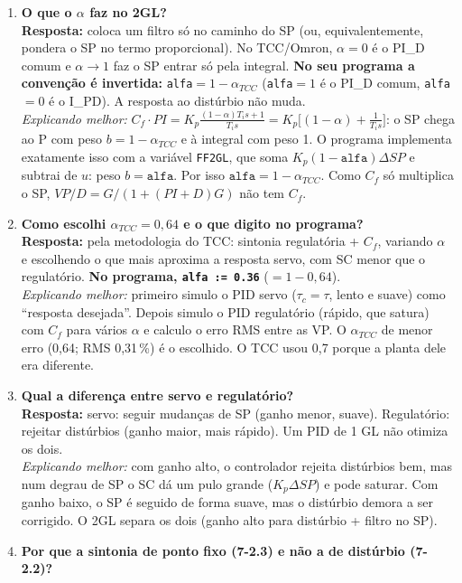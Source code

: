 \documentclass[11pt,a4paper]{article}
\begin{document}
\begin{enumerate}[leftmargin=*]
\item \textbf{O que o $\alpha$ faz no 2GL?}\\
\textbf{Resposta:} coloca um filtro só no caminho do SP (ou, equivalentemente, pondera o SP no termo proporcional). No TCC/Omron, $\alpha=0$ é o PI\_D comum e $\alpha\to1$ faz o SP entrar só pela integral. \textbf{No seu programa a convenção é invertida:} \texttt{alfa}$=1-\alpha_{TCC}$ (\texttt{alfa}$=1$ é o PI\_D comum, \texttt{alfa}$=0$ é o I\_PD). A resposta ao distúrbio não muda.\\
\emph{Explicando melhor:} $C_f\cdot PI=K_p\frac{(1-\alpha)T_is+1}{T_is}=K_p\big[(1-\alpha)+\frac1{T_is}\big]$: o SP chega ao P com peso $b=1-\alpha_{TCC}$ e à integral com peso 1. O programa implementa exatamente isso com a variável \texttt{FF2GL}, que soma $K_p(1-\mathtt{alfa})\Delta SP$ e subtrai de $u$: peso $b=\mathtt{alfa}$. Por isso $\mathtt{alfa}=1-\alpha_{TCC}$. Como $C_f$ só multiplica o SP, $VP/D=G/(1+(PI+D)G)$ não tem $C_f$.
\item \textbf{Como escolhi $\alpha_{TCC}=0{,}64$ e o que digito no programa?}\\
\textbf{Resposta:} pela metodologia do TCC: sintonia regulatória + $C_f$, variando $\alpha$ e escolhendo o que mais aproxima a resposta servo, com SC menor que o regulatório. \textbf{No programa, \texttt{alfa := 0.36}} ($=1-0{,}64$).\\
\emph{Explicando melhor:} primeiro simulo o PID servo ($\tau_c=\tau$, lento e suave) como ``resposta desejada''. Depois simulo o PID regulatório (rápido, que satura) com $C_f$ para vários $\alpha$ e calculo o erro RMS entre as VP. O $\alpha_{TCC}$ de menor erro (0,64; RMS 0,31\,\%) é o escolhido. O TCC usou 0,7 porque a planta dele era diferente.
\item \textbf{Qual a diferença entre servo e regulatório?}\\
\textbf{Resposta:} servo: seguir mudanças de SP (ganho menor, suave). Regulatório: rejeitar distúrbios (ganho maior, mais rápido). Um PID de 1 GL não otimiza os dois.\\
\emph{Explicando melhor:} com ganho alto, o controlador rejeita distúrbios bem, mas num degrau de SP o SC dá um pulo grande ($K_p\Delta SP$) e pode saturar. Com ganho baixo, o SP é seguido de forma suave, mas o distúrbio demora a ser corrigido. O 2GL separa os dois (ganho alto para distúrbio + filtro no SP).
\item \textbf{Por que a sintonia de ponto fixo (7-2.3) e não a de distúrbio (7-2.2)?}\\

\end{enumerate}
\end{document}
